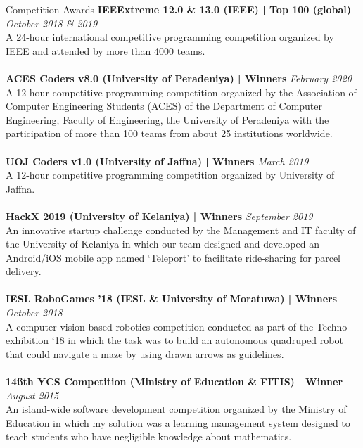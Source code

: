 \documentclass{cv}
\begin{document}

\begin{rSection}{Competition Awards}{
{\bf IEEExtreme 12.0 \& 13.0 (IEEE) | Top 100 (global)}                         \hfill {\em October 2018 \& 2019} 
\\A 24-hour international competitive programming competition organized by IEEE and attended by more than 4000 teams.\\ \\
{\bf ACES Coders v8.0 (University of Peradeniya) | Winners}                     \hfill {\em February 2020} 
\\A 12-hour competitive programming competition organized by the Association of Computer Engineering Students (ACES) of the Department of Computer Engineering, Faculty of Engineering, the University of Peradeniya with the participation of more than 100 teams from about 25 institutions worldwide.\\ \\
{\bf UOJ Coders v1.0 (University of Jaffna) | Winners}                          \hfill {\em March 2019} 
\\A 12-hour competitive programming competition organized by University of Jaffna.\\ \\
{\bf HackX 2019 (University of Kelaniya) | Winners}                             \hfill {\em September 2019} 
\\An innovative startup challenge conducted by the Management and IT faculty of the University of Kelaniya in which our team designed and developed an Android/iOS mobile app named `Teleport' to facilitate ride-sharing for parcel delivery.\\ \\
{\bf IESL RoboGames '18 (IESL \& University of Moratuwa) | Winners}             \hfill {\em October 2018} 
\\A computer-vision based robotics competition conducted as part of the Techno exhibition `18 in which the task was to build an autonomous quadruped robot that could navigate a maze by using drawn arrows as guidelines.\\ \\
{\bf 14\ss{th} YCS Competition (Ministry of Education \& FITIS) | Winner}       \hfill {\em August 2015} 
\\An island-wide software development competition organized by the Ministry of Education in which my solution was a learning management system designed to teach students who have negligible knowledge about mathematics.\\ \\
}
\end{rSection}
\end{document}
